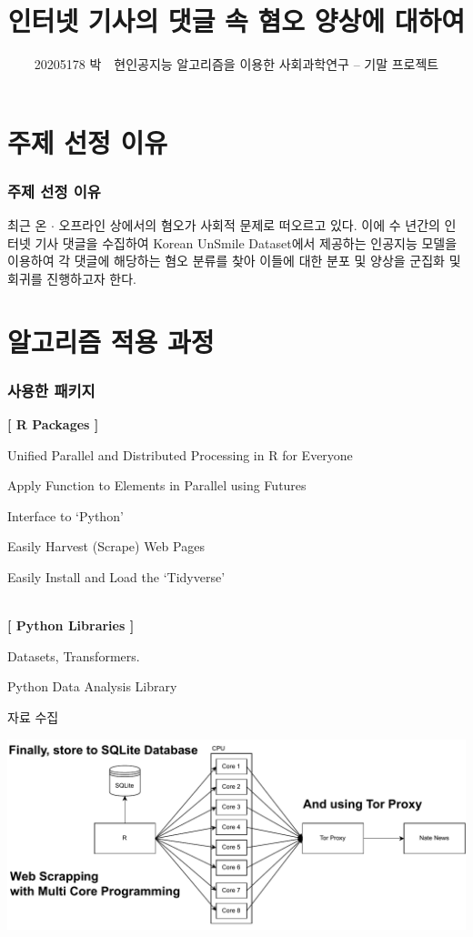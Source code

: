 \documentclass[mathserif, aspectratio=169]{beamer}
\title{인터넷 기사의 댓글 속 혐오 양상에 대하여}
\author{20205178 박~~현\hfill 인공지능 알고리즘을 이용한 사회과학연구 -- 기말 프로젝트}
\institute{}
\date{}
\begin{document}
\frame{\titlepage}

\section{주제 선정 이유}
\begin{frame}
    \frametitle{주제 선정 이유}
    \justifying
    최근 온 $\cdot$ 오프라인 상에서의 혐오가 사회적 문제로 떠오르고 있다.
    이에 수 년간의 인터넷 기사 댓글을 수집하여 Korean UnSmile Dataset에서 제공하는 인공지능 모델을
    이용하여 각 댓글에 해당하는 혐오 분류를 찾아 이들에 대한 분포 및 양상을 군집화 및 회귀를 진행하고자 한다.
\end{frame}
\section{알고리즘 적용 과정}
\begin{frame}
    \frametitle{사용한 패키지}
    \textbf{[ R Packages ]}
    \begin{description}[labelwidth=3cm]
        \item [future:] Unified Parallel and Distributed Processing in R for Everyone
        \item [future.apply:] Apply Function to Elements in Parallel using Futures
        \item [reticulate:]  Interface to `Python'
        \item [rvest:] Easily Harvest (Scrape) Web Pages
        \item [tidyverse:] Easily Install and Load the `Tidyverse'
    \end{description}
    ~\\
    \textbf{[ Python Libraries ]}
    \begin{description}[labelwidth=3cm]
        \item [Hugging Face:] Datasets, Transformers.
        \item [Pandas:] Python Data Analysis Library
    \end{description}
\end{frame}
\begin{frame}{자료 수집}

    \includegraphics[width = \linewidth]{images/data_scrap.pdf}
\end{frame}
\end{document}
